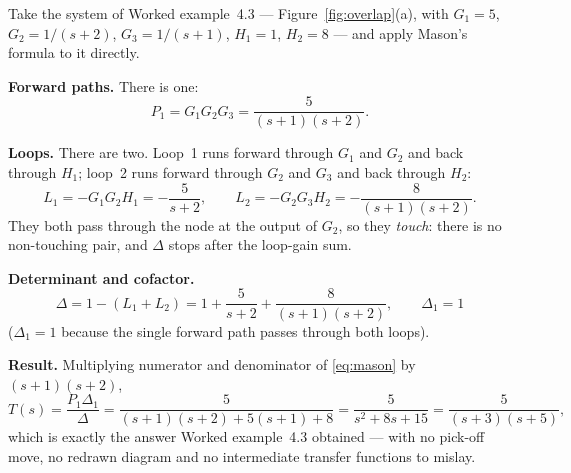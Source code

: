 \documentclass[11pt,a4paper]{article}
\begin{document}
\begin{workedex}[breakable, title={Worked example 4.4 --- the overlapping-loop system again, in one line}]
Take the system of Worked example~4.3 --- Figure~\ref{fig:overlap}(a), with
$G_1=5$, $G_2=1/(s+2)$, $G_3=1/(s+1)$, $H_1=1$, $H_2=8$ --- and apply Mason's
formula to it directly.

\medskip
\textbf{Forward paths.} There is one:
\[
  P_1 = G_1G_2G_3 = \frac{5}{(s+1)(s+2)} .
\]

\medskip
\textbf{Loops.} There are two. Loop~1 runs forward through $G_1$ and $G_2$ and
back through $H_1$; loop~2 runs forward through $G_2$ and $G_3$ and back
through $H_2$:
\[
  L_1 = -G_1G_2H_1 = -\frac{5}{s+2},
  \qquad
  L_2 = -G_2G_3H_2 = -\frac{8}{(s+1)(s+2)} .
\]
They both pass through the node at the output of $G_2$, so they
\emph{touch}: there is no non-touching pair, and $\Delta$ stops after the
loop-gain sum.

\medskip
\textbf{Determinant and cofactor.}
\[
  \Delta = 1-(L_1+L_2) = 1+\frac{5}{s+2}+\frac{8}{(s+1)(s+2)} ,
  \qquad \Delta_1 = 1
\]
($\Delta_1=1$ because the single forward path passes through both loops).

\medskip
\textbf{Result.} Multiplying numerator and denominator of \eqref{eq:mason} by
$(s+1)(s+2)$,
\[
  T(s)=\frac{P_1\Delta_1}{\Delta}
   =\frac{5}{(s+1)(s+2)+5(s+1)+8}
   =\frac{5}{s^{2}+8s+15}
   =\frac{5}{(s+3)(s+5)} ,
\]
which is exactly the answer Worked example~4.3 obtained --- with no pick-off
move, no redrawn diagram and no intermediate transfer functions to mislay.
\end{workedex}
\end{document}
